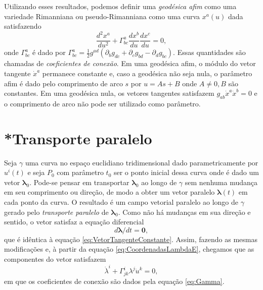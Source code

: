 Utilizando esses resultados, podemos definir uma \textit{geodésica afim} como uma variedade Rimanniana ou pseudo-Rimanniana como uma curva $ x^a(u) $ dada satisfazendo
\begin{equation}\label{eq:GeodesicaAfimPseudoRimanniana}
\boxed{
	\frac{d^{2} x^{a}}{d u^{2}}+\Gamma_{b c}^{a} \frac{d x^{b}}{d u} \frac{d x^{c}}{d u}=0 ,
}
\end{equation}
onde $ \Gamma^{a}_{bc} $ é dado por $ \Gamma_{b c}^{a}=\tfrac{1}{2} g^{a d}\left(\partial_{b} g_{d c}+\partial_{c} g_{b d}-\partial_{d} g_{b c}\right) $. Essas quantidades são chamadas de \textit{coeficientes de conexão}.
Em uma geodésica afim, o módulo do vetor tangente $ \dot{x}^a $ permanece constante e, caso a geodésica não seja nula, o parâmetro afim é dado pelo comprimento de arco $ s $ por $ u=As+B $ onde $ A\neq0,B $ são constantes. Em uma geodésica nula, os vetores tangentes satisfazem $ g_{a b} \dot{x}^{a} \dot{x}^{b}=0 $ e o comprimento de arco não pode ser utilizado como parâmetro.

 
\section{*Transporte paralelo}\label{sec:TransporteParalelo} %

Seja $ \gamma $ uma curva no espaço euclidiano tridimensional dado parametricamente por $ u^i(t) $ e seja $ P_0 $ com parâmetro $ t_0 $ ser o ponto inicial dessa curva onde é dado um vetor $ \boldsymbol{\lambda}_0 $. Pode-se pensar em transportar $ \boldsymbol{\lambda}_0 $ ao longo de $ \gamma $ sem nenhuma mudança em seu comprimento ou direção, de modo a obter um vetor paralelo $ \boldsymbol{\lambda}(t) $ em cada ponto da curva. O resultado é um campo vetorial paralelo ao longo de $ \gamma $ gerado pelo \textit{transporte paralelo} de $ \boldsymbol{\lambda}_0 $. Como não há mudanças em sua direção e sentido, o vetor satisfaz a equação diferencial 
\begin{equation}\label{eq:TransporteParalelo}
d \boldsymbol{\lambda} / d t=\mathbf{0}  ,
\end{equation}
que é idêntica à equação \eqref{eq:VetorTangenteConstante}. Assim, fazendo as mesmas modificações e, à partir da equação \eqref{eq:CoordenadasLambdaE}, chegamos que as componentes do vetor satisfazem 
\begin{equation}\label{eq:CoordenadasLambda}
\dot{\lambda}^{i}+\Gamma_{j k}^{i} \lambda^{j} \dot{u}^{k}=0 ,
\end{equation}
em que os coeficientes de conexão são dados pela equação \eqref{eq:Gamma}.


